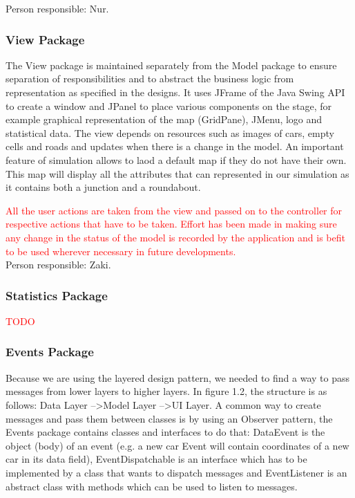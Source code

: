 \documentclass{article}
\begin{document}
	
	\noindent
	Person responsible: Nur. 
	
	\subsubsection{View Package}
		The View package is maintained separately from the Model package to ensure separation of responsibilities and to abstract the business logic from representation as specified in the designs. 
		It uses JFrame of the Java Swing API to create a window and JPanel to place various components on the stage, for example graphical representation of the map (GridPane), JMenu, logo and statistical data. 
		The view depends on resources such as images of cars, empty cells and roads and updates when there is a change in the model.  An important feature of simulation allows  to laod a default map if they do not have their own. This map will display all the attributes that can represented in our simulation as it contains both a junction and a roundabout.
		
		\textcolor{red}{All the user actions are taken from the view and passed on to the controller for respective actions that have to be taken. Effort has been made in making sure any change in the status of the model is recorded by the application and is befit to be used wherever necessary in future developments.}\\
		
	
	\noindent
	Person responsible: Zaki.
	
	\subsubsection{Statistics Package}
	\textcolor{red}{TODO}
	
	\subsubsection{Events Package}
	Because we are using the layered design pattern, we needed to find a way to pass messages from lower layers to higher layers. In figure 1.2, the structure is as follows: Data Layer --\textgreater Model Layer --\textgreater UI Layer. 
	A common way to create messages and pass them between classes is by using an Observer pattern, the Events package contains classes and interfaces to do that: DataEvent is the object (body) of an event (e.g. a new car Event will contain coordinates of a new car in its data field), EventDispatchable is an interface which has to be implemented by a class that wants to dispatch messages and EventListener is an abstract class with methods which can be used to listen to messages.\\
	
\end{document}
